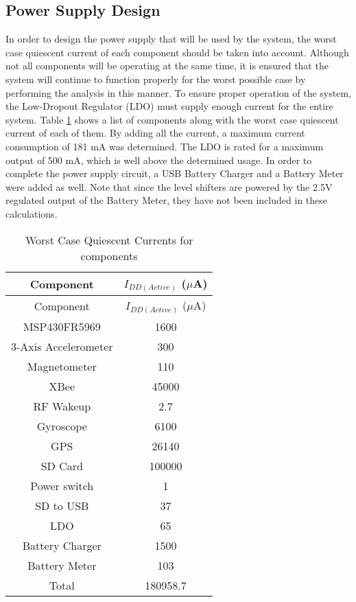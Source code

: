 \subsection{Power Supply Design}
In order to design the power supply that will be used by the system, the worst case quiescent current of each component should be taken into account.  Although not all components will be operating at the same time, it is ensured that the system will continue to function properly for the worst possible case by performing the analysis in this manner.  To ensure proper operation of the system, the Low-Dropout Regulator (LDO) must supply enough current for the entire system.  Table \ref{tab:powerSupply} shows a list of components along with the worst case quiescent current of each of them.  By adding all the current, a maximum current consumption of 181 mA was determined.  The LDO is rated for a maximum output of 500 mA, which is well above the determined usage.  In order to complete the power supply circuit, a USB Battery Charger and a Battery Meter were added as well. Note that since the level shifters are powered by the 2.5V regulated output of the Battery Meter, they have not been included in these calculations.
\begin{center}
    \begin{longtable}{|c|c|}
    \caption{Worst Case Quiescent Currents for components  \label{tab:powerSupply}} \\
     \hline
    \rowcolor{Gray}
   Component & $I_{DD(Active)}$ ($\mu$A) \\
    \hline \hline \endfirsthead
    
         \hline
    \rowcolor{Gray}
  Component & $I_{DD(Active)}$ ($\mu$A) \\
    \hline \hline \endhead
    
    \endfoot

    MSP430FR5969 & 1600   \\ \hline
    3-Axis Accelerometer & 300  \\ \hline
    Magnetometer & 110  \\ \hline
    XBee  & 45000 \\ \hline
    RF Wakeup & 2.7   \\ \hline
    Gyroscope & 6100  \\ \hline
    GPS   & 26140 \\ \hline
    SD Card & 100000  \\ \hline
    Power switch & 1  \\ \hline
    SD to USB & 37   \\ \hline
    LDO   & 65  \\ \hline
    Battery Charger & 1500  \\ \hline
    Battery Meter & 103   \\ \hline \hline
    Total & 180958.7  \\ \hline     
    \end{longtable}%

\end{center}%
  \vspace{-2cm}

